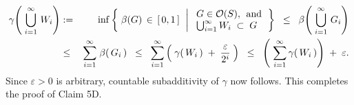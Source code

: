 \begin{eqnarray*}
\gamma\!\left(\;\bigcup_{i=1}^{\infty}\,W_{i}\right)
& := &
\inf\left\{\;
	\beta(G) \,\in\, [\,0,1\,]
	\,\;\left\vert\;
		\begin{array}{l} G \in \mathcal{O}(S), \;\,\textnormal{and} \\ \bigcup_{i=1}^{\infty}W_{i} \;\subset\; G \end{array}
	\right.
\right\}
\;\;\leq\;\; \beta\!\left(\;\bigcup_{i=1}^{\infty}\,G_{i}\right)
\\
&\leq& \overset{\infty}{\underset{i=1}{\sum}}\;\beta\!\left(\,G_{i}\,\right)
\;\;\leq\;\; \overset{\infty}{\underset{i=1}{\sum}}\left(\;\gamma\!\left(\,W_{i}\,\right) \;+\; \dfrac{\varepsilon}{2^{i}}\;\right)
\;\;\leq\;\; \left(\;\overset{\infty}{\underset{i=1}{\sum}}\,\gamma\!\left(\,W_{i}\,\right)\right) \;+\; \varepsilon.
\end{eqnarray*}
Since $\varepsilon > 0$ is arbitrary, countable subadditivity of $\gamma$ now follows.
This completes the proof of Claim 5D.

